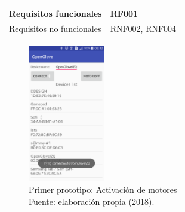 \begin{table}[H]
\begin{tabular}{|l|l|}
Requisitos funcionales    & RF001                                                                                                                                                                                                                                                                                                                                                                                                             \\ \hline
Requisitos no funcionales & RNF002, RNF004                                                                                                                                                                                                                                                                                                                                                                                                     \\ \hline
\end{tabular}
\end{table}

\begin{figure}[H]
	\centering
	\captionsetup{justification=centering}
   	\includegraphics[width=0.3\textwidth]{images/chapter03/01-prototype.png} 
    \caption[Primer prototipo: activación de motores]{Primer prototipo: Activación de motores \\ Fuente: elaboración propia (2018).}
    \label{fig:prototype-01}
\end{figure}

